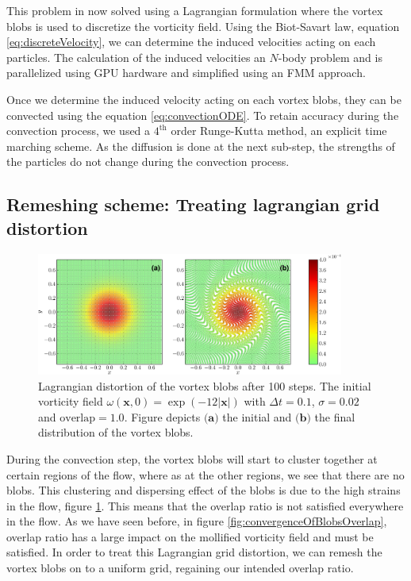 This problem in now solved using a Lagrangian formulation where the vortex blobs is used to discretize the vorticity field. Using the Biot-Savart law, equation \ref{eq:discreteVelocity}, we can determine the induced velocities acting on each particles. The calculation of the induced velocities an $N$-body problem and is parallelized using GPU hardware and simplified using an FMM approach.

Once we determine the induced velocity acting on each vortex blobs, they can be convected using the equation \ref{eq:convectionODE}. To retain accuracy during the convection process, we used a $4^{\mathrm{th}}$ order Runge-Kutta method, an explicit time marching scheme. As the diffusion is done at the next sub-step, the strengths of the particles do not change during the convection process.

\subsection{Remeshing scheme: Treating lagrangian grid distortion}
\label{subsec:remeshing}

	\begin{figure}[t]
	\centering
	\includegraphics[width=0.9\textwidth]{figures/lagrangian/distortion-crop.pdf}
    \caption{Lagrangian distortion of the vortex blobs after 100 steps. The initial vorticity field $\omega\left(\mathbf{x},0\right) = \exp\left(-12\left|\mathbf{x}\right|\right)$ with $\Delta t = 0.1$, $\sigma=0.02$ and $\mathrm{overlap} = 1.0$. Figure depicts $\textbf{(a)}$ the initial and $\textbf{(b)}$ the final distribution of the vortex blobs.}
    \label{fig:distortion}
	\end{figure}

During the convection step, the vortex blobs will start to cluster together at certain regions of the flow, where as at the other regions, we see that there are no blobs. This clustering and dispersing effect of the blobs is due to the high strains in the flow, figure \ref{fig:distortion}. This means that the overlap ratio is not satisfied everywhere in the flow. As we have seen before, in figure \ref{fig:convergenceOfBlobsOverlap}, overlap ratio has a large impact on the mollified vorticity field and must be satisfied. In order to treat this Lagrangian grid distortion, we can remesh the vortex blobs on to a uniform grid, regaining our intended overlap ratio.

